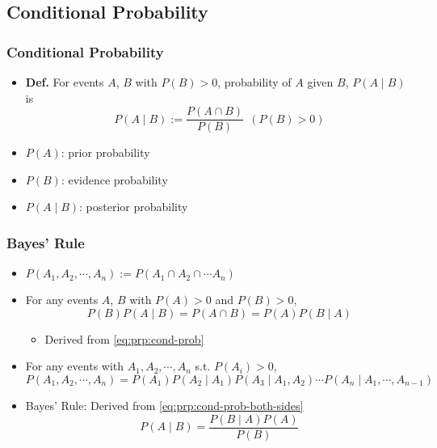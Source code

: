 \subsection{Conditional Probability}

\subsubsection*{Conditional Probability}
\begin{itemize}
    \item \textbf{Def.} For events $A$, $B$ with $P(B)>0$, probability of $A$ given $B$, $P(A\mid B)$ is
    \begin{equation}\label{eq:prp:cond-prob}
        P(A\mid B):=\frac{P(A\cap B)}{P(B)}~~(P(B)>0)
    \end{equation}
    \item $P(A)$: prior probability
    \item $P(B)$: evidence probability
    \item $P(A\mid B)$: posterior probability
\end{itemize}

\subsubsection*{Bayes' Rule}
\begin{itemize}
    \item $P(A_1,A_2,\cdots,A_n):=P(A_1\cap A_2\cap\cdots A_n)$
    \item For any events $A$, $B$ with $P(A)>0$ and $P(B)>0$,
    \begin{equation}\label{eq:prp:cond-prob-both-sides}
        P(B)P(A\mid B)=P(A\cap B)=P(A)P(B\mid A)
    \end{equation}
    \begin{itemize}
        \item Derived from \ref{eq:prp:cond-prob}
    \end{itemize}
    \item For any events with $A_1,A_2,\cdots,A_n$ s.t. $P(A_i)>0$,
    \begin{equation}
        P(A_1,A_2,\cdots,A_n)=P(A_1)P(A_2\mid A_1)P(A_3\mid A_1,A_2)\cdots P(A_n\mid A_1,\cdots,A_{n-1})
    \end{equation}
    \item Bayes' Rule: Derived from \ref{eq:prp:cond-prob-both-sides}
    \begin{equation}\label{eq:prp:bayes-rule}
        P(A\mid B)=\frac{P(B\mid A)P(A)}{P(B)}
    \end{equation}
\end{itemize}

